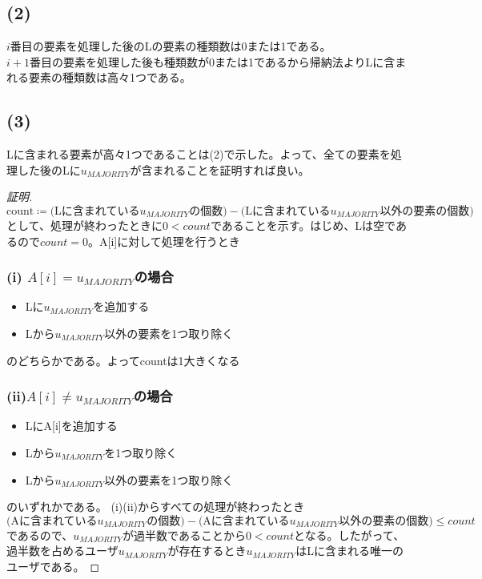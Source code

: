 \documentclass[a4paper,12pt,xelatex,ja=standard]{bxjsarticle}
\begin{document}
\subsection*{(2)}
$i$番目の要素を処理した後のLの要素の種類数は0または1である。\\
$i+1$番目の要素を処理した後も種類数が0または1であるから帰納法よりLに含まれる要素の種類数は高々1つである。

\subsection*{(3)}
Lに含まれる要素が高々1つであることは(2)で示した。よって、全ての要素を処理した後のLに$u_{MAJORITY}$が含まれることを証明すれば良い。\\
\begin{proof}[証明]
  \[
    \text{count} \coloneqq \text{(Lに含まれている$u_{MAJORITY}$の個数)} - \text{(Lに含まれている$u_{MAJORITY}$以外の要素の個数)}
  \]
  として、処理が終わったときに$0 < count$であることを示す。はじめ、Lは空であるので$count = 0$。A[i]に対して処理を行うとき\\
  \subsubsection*{(i) $A[i] = u_{MAJORITY}$の場合}
  \begin{itemize}
    \item Lに$u_{MAJORITY}$を追加する
    \item Lから$u_{MAJORITY}$以外の要素を1つ取り除く
  \end{itemize}
  のどちらかである。よってcountは1大きくなる
  \subsubsection*{(ii)$A[i] \neq u_{MAJORITY}$の場合}
  \begin{itemize}
    \item LにA[i]を追加する
    \item Lから$u_{MAJORITY}$を1つ取り除く
    \item Lから$u_{MAJORITY}$以外の要素を1つ取り除く
  \end{itemize}
  のいずれかである。
  (i)(ii)からすべての処理が終わったとき
  \[
    \text{(Aに含まれている$u_{MAJORITY}$の個数)} - \text{(Aに含まれている$u_{MAJORITY}$以外の要素の個数)} \leq count
  \]
  であるので、$u_{MAJORITY}$が過半数であることから$0 < count$となる。したがって、過半数を占めるユーザ$u_{MAJORITY}$が存在するとき$u_{MAJORITY}$はLに含まれる唯一のユーザである。
\end{proof}
\end{document}
